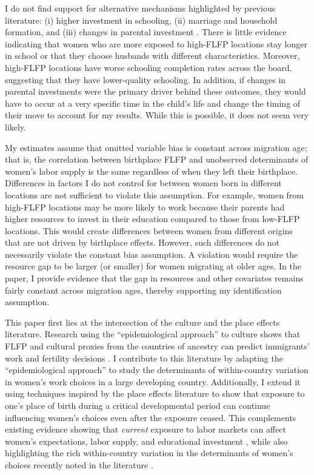 I do not find support for alternative mechanisms highlighted by previous literature: (i) higher investment in schooling, (ii) marriage and household formation, and (iii) changes in parental investment \citep{Molina2022,Fernandez2004,Blau2011}.  There is little evidence indicating that women who are more exposed to high-FLFP locations stay longer in school or that they choose husbands with different characteristics. Moreover, high-FLFP locations have worse schooling completion rates across the board, suggesting that they have lower-quality schooling. In addition, if changes in parental investments were the primary driver behind these outcomes, they would have to occur at a very specific time in the child's life and change the timing of their move to account for my results. While this is possible, it does not seem very likely.

My estimates assume that omitted variable bias is constant across migration age; that is, the correlation between birthplace FLFP and unobserved determinants of women's labor supply is the same regardless of when they left their birthplace. Differences in factors I do not control for between women born in different locations are not sufficient to violate this assumption. For example, women from high-FLFP locations may be more likely to work because their parents had higher resources to invest in their education compared to those from low-FLFP locations. This would create differences between women from different origins that are not driven by birthplace effects. However, such differences do not necessarily violate the constant bias assumption. A violation would require the resource gap to be larger (or smaller) for women migrating at older ages. In the paper, I provide evidence that the gap in resources and other covariates remains fairly constant across migration ages, thereby supporting my identification assumption.


This paper first lies at the intersection of the culture and the place effects literature. Research using the ``epidemiological approach'' to culture shows that FLFP and cultural proxies from the countries of ancestry can predict immigrants' work and fertility decisions \citep{Fernandez2004,Fernandez2009,Fernandez2013,Nollenberger2016a}. I contribute to this literature by adapting the ``epidemiological approach'' to study the determinants of within-country variation in women's work choices in a large developing country. Additionally, I extend it using techniques inspired by the place effects literature \citep{Chetty2018, Chetty2018a, Milsom2021} to show that exposure to one's place of birth during a critical developmental period can continue influencing women's choices even after the exposure ceased. This complements existing evidence showing that \textit{current} exposure to labor markets can affect women's expectations, labor supply, and educational investment \citep{Molina2022, Boelmann, Milsom2021,Moreno-Maldonado2019}, while also highlighting the rich within-country variation in the determinants of women's choices recently noted in the literature \citep{Charles2018,Boelmann}.


